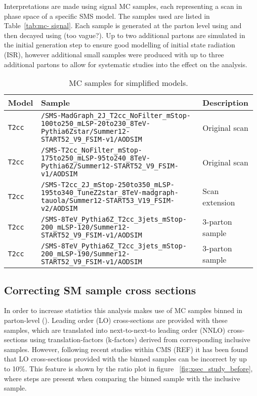 Interpretations are made using signal MC samples, each representing a scan in 
phase space of a specific SMS model. The samples used are listed in Table~\ref{tab:mc-
signal}. Each sample is generated at the parton level using \MADGRAPH and then
decayed using \PYTHIA (too vague?). Up to two additional partons are simulated 
in the initial generation step to ensure good modelling of initial state 
radiation (ISR), however additional small samples were produced with up to three
additional partons to allow for systematic studies into the effect on the 
analysis.

\begin{landscape}
  \begin{center}
    \begin{table}[h]
      \caption{MC samples for simplified models.}
      \label{tab:mc-signal}
      \centering
      \tiny
      \begin{tabular}{ lll }
        \hline
        Model & Sample & Description \\
        \hline
        \hline
        \verb!T2cc! & \verb!/SMS-MadGraph_2J_T2cc_NoFilter_mStop-100to250_mLSP-20to230_8TeV-Pythia6Zstar/Summer12-START52_V9_FSIM-v1/AODSIM! & Original scan \\
        \verb!T2cc! & \verb!/SMS-T2cc_NoFilter_mStop-175to250_mLSP-95to240_8TeV-Pythia6Z/Summer12-START52_V9_FSIM-v1/AODSIM! & Original scan \\
        \verb!T2cc! & \verb!/SMS-T2cc_2J_mStop-250to350_mLSP-195to340_TuneZ2star_8TeV-madgraph-tauola/Summer12-START53_V19_FSIM-v2/AODSIM! & Scan extension \\
        \verb!T2cc! & \verb!/SMS-8TeV_Pythia6Z_T2cc_3jets_mStop-200_mLSP-120/Summer12-START52_V9_FSIM-v1/AODSIM! & 3-parton sample \\
        \verb!T2cc! & \verb!/SMS-8TeV_Pythia6Z_T2cc_3jets_mStop-200_mLSP-190/Summer12-START52_V9_FSIM-v1/AODSIM! & 3-parton sample \\
        \hline
        \hline
      \end{tabular}
    \end{table}
  \end{center}
\end{landscape}

\subsection{Correcting SM sample cross sections}
In order to increase statistics this analysis makes use of MC samples binned in 
parton-level \HT (\HTpart). Leading order (LO) cross-sections are provided with 
these samples, which are translated into next-to-next-to leading order (NNLO) 
cross-sections using translation-factors (k-factors) derived from corresponding 
inclusive samples. However, following recent studies within CMS (REF) it has 
been found that LO cross-sections provided with the \HTpart binned samples can 
be incorrect by up to 10\%. This feature is shown by the ratio plot in figure~
\ref{fig:xsec_study_before}, where steps are present when comparing the \zj binned
sample with the \dyj inclusive sample.

